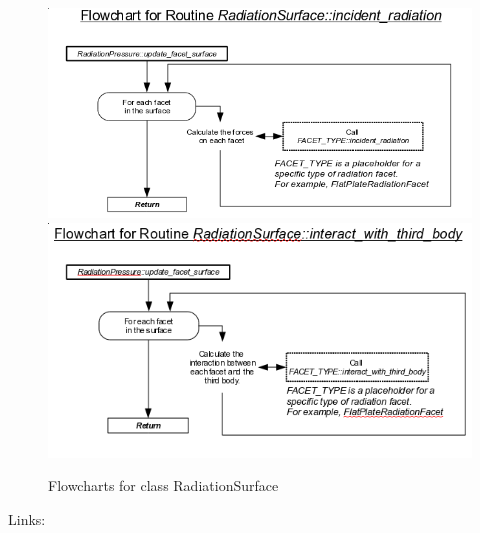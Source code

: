 \begin{figure}[!ht]
  \includegraphics[width = 6 in]{figs/flowchart/flow_incident_radiation.png}
  \label{fig:flow_incident_radiation}
  \includegraphics[width = 6 in]{figs/flowchart/flow_interact_with_third_body.png}
  \label{fig:flow_interact_with_third_body}
  \caption{Flowcharts for class RadiationSurface }
\end{figure}
Links: \newline
{}\newline
{}\newline
{}\newline
\clearpage

